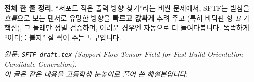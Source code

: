 \documentclass[11pt,a4paper]{article}
\begin{document}
\begin{readbox}
\textbf{전체 한 줄 정리.} ``서포트 적은 출력 방향 찾기''라는 비싼 문제에서, SFTF는
받침을 \emph{흐름}으로 보는 텐서로 유망한 방향을 \textbf{빠르고 값싸게} 추려 주고
(특히 바닥판 항 $B$ 가 핵심), 그 둘레만 정밀 검증하며, 어려운 경우엔 자동으로 더
들여다봅니다. 똑똑하게 ``어디를 볼지'' 잘 찍어 주는 도구입니다.
\end{readbox}

\vfill
\begin{center}\small
\textit{원문: \texttt{SFTF\_draft.tex} (Support Flow Tensor Field for Fast
Build-Orientation Candidate Generation).\\
이 글은 같은 내용을 고등학생 눈높이로 풀어 쓴 해설본입니다.}
\end{center}
\end{document}
